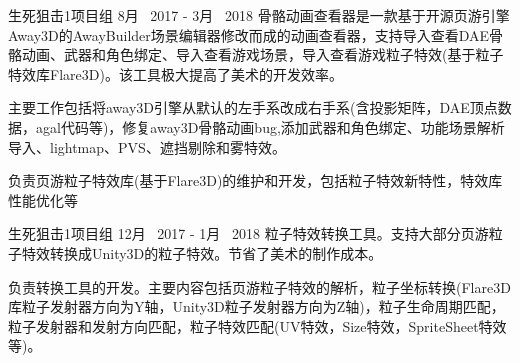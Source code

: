 \begin{cventries}
\cventryproject
{生死狙击1项目组} %
{8月~ 2017 - 3月~ 2018} %
{骨骼动画查看器是一款基于开源页游引擎Away3D的AwayBuilder场景编辑器修改而成的动画查看器，支持导入查看DAE骨骼动画、武器和角色绑定、导入查看游戏场景，导入查看游戏粒子特效(基于粒子特效库Flare3D)。该工具极大提高了美术的开发效率。}
{ %
	\begin{cvitems}
		\item {主要工作包括将away3D引擎从默认的左手系改成右手系(含投影矩阵，DAE顶点数据，agal代码等)，修复away3D骨骼动画bug,添加武器和角色绑定、功能场景解析导入、lightmap、PVS、遮挡剔除和雾特效。}
		\item {负责页游粒子特效库(基于Flare3D)的维护和开发，包括粒子特效新特性，特效库性能优化等}
	\end{cvitems}
}
\cventryproject
{生死狙击1项目组} %
{12月~ 2017 - 1月~ 2018} %
{粒子特效转换工具。支持大部分页游粒子特效转换成Unity3D的粒子特效。节省了美术的制作成本。}
{ %
	\begin{cvitems}
		\item {负责转换工具的开发。主要内容包括页游粒子特效的解析，粒子坐标转换(Flare3D库粒子发射器方向为Y轴，Unity3D粒子发射器方向为Z轴)，粒子生命周期匹配，粒子发射器和发射方向匹配，粒子特效匹配(UV特效，Size特效，SpriteSheet特效等)。}
	\end{cvitems}
}



\end{cventries}

